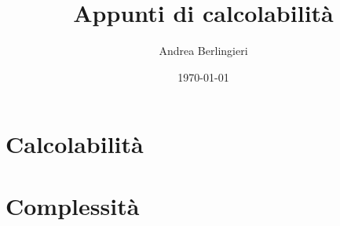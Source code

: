 \documentclass{report}
\begin{document}
\title{Appunti di calcolabilità}
\author{Andrea Berlingieri}
\date{\today}
\maketitle
\tableofcontents
%
\part{Calcolabilità}










\part{Complessità}


%
%
%
%
%
\end{document}
